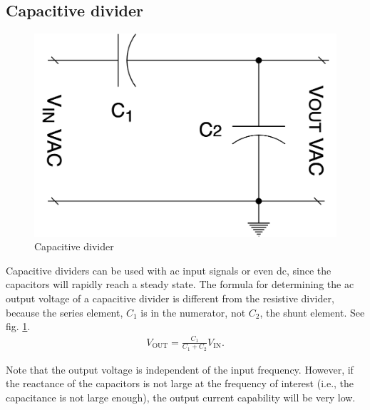 \documentclass[../../document]{subfiles}
\begin{document}
\subsection{Capacitive divider}
\begin{figure}
	\begin{center}
		\includegraphics[width=\linewidth]{capacitive_divider.drawio.png}
	\end{center}
	\caption{Capacitive divider}\label{fig:capacitive_divider}
\end{figure}
Capacitive dividers can be used with ac input signals or even dc, since the
capacitors will rapidly reach a steady state. The formula for determining the
ac output voltage of a capacitive divider is different from the resistive
divider, because the series element, \(C_1\) is in the numerator, not \(C_2\), the
shunt element. See fig. \ref{fig:capacitive_divider}.
\begin{gather}
	V_{\text{OUT}} = \frac{C_1}{C_1+C_2}V_{\text{IN}}.
\end{gather}

Note that the output voltage is independent of the input frequency. However, if
the reactance of the capacitors is not large at the frequency of interest
(i.e., the capacitance is not large enough), the output current capability
will be very low. \cite{practical_electronics}
\end{document}
